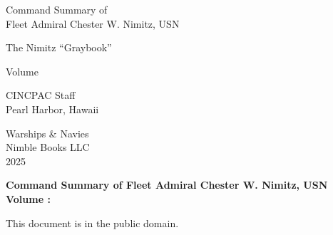\documentclass[11pt]{book}
\begin{document}
\frontmatter
\pagestyle{frontmatter}

\begin{titlepage}
    \begin{center}
        \vspace*{2in}

        {\Huge\headingfont Command Summary of\\[0.3cm]
        Fleet Admiral Chester W. Nimitz, USN}

        \vspace{0.5in}

        {\LARGE\headingfont The Nimitz ``Graybook''}

        \vspace{0.5in}

        {\Large\headingfont Volume }

        \vspace{0.3in}

        {\large{}}

        \vfill

        {\large{}}

        \vspace{0.5in}

        {\large CINCPAC Staff}\\[0.2cm]
        {\normalsize Pearl Harbor, Hawaii}

        \vspace{1in}

        {\large\headingfont Warships \& Navies}\\
        {\normalsize Nimble Books LLC}\\
        {\normalsize 2025}
    \end{center}
\end{titlepage}

\newpage
\thispagestyle{empty}
\vspace*{5in}

\noindent
\textbf{Command Summary of Fleet Admiral Chester W. Nimitz, USN}\\
\textbf{Volume : }

\vspace{0.3in}

\noindent
This document is in the public domain.

\vspace{0.2in}
\end{document}
